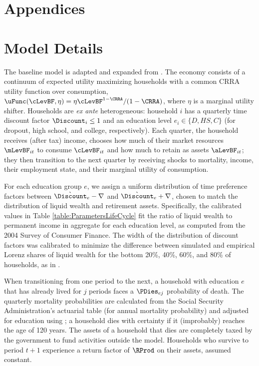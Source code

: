 \documentclass[./ConsumptionResponse]{subfiles}
\begin{document}
\pagestyle{empty}
\appendix
\section*{Appendices}

\section{Model Details} \label{model_details}

The baseline model is adapted and expanded from \cite{cstwMPC}.
The economy consists of a continuum of expected utility maximizing households with a common CRRA utility function over consumption, $\uFunc(\cLevBF,\eta) = \eta \cLevBF^{1-\CRRA}/(1-\CRRA)$, where $\eta$ is a marginal utility shifter.
Households are \textit{ex ante} heterogeneous: household $i$ has a quarterly time discount factor $\Discount_i \leq 1$ and an education level $e_i \in \{D,HS,C\}$ (for dropout, high school, and college, respectively).
Each quarter, the household receives (after tax) income, chooses how much of their market resources $\mLevBF_{it}$ to consume $\cLevBF_{it}$ and how much to retain as assets $\aLevBF_{it}$; they then transition to the next quarter by receiving shocks to mortality, income, their employment state, and their marginal utility of consumption.

For each education group $e$, we assign a uniform distribution of time preference factors between $\grave{\Discount}_e-\nabla$ and $\grave{\Discount}_e+\nabla$, chosen to match the distribution of liquid wealth and retirement assets.
Specifically, the calibrated values in Table \ref{table:ParametersLifeCycle} fit the ratio of liquid wealth to permanent income in aggregate for each education level, as computed from the 2004 Survey of Consumer Finance.
The width of the distribution of discount factors was calibrated to minimize the difference between simulated and empirical Lorenz shares of liquid wealth for the bottom 20\%, 40\%, 60\%, and 80\% of households, as in \cite{cstwMPC}.

When transitioning from one period to the next, a household with education $e$ that has already lived for $j$ periods faces a $\PDies_{ej}$ probability of death.
The quarterly mortality probabilities are calculated from the Social Security Administration's actuarial table (for annual mortality probability) and adjusted for education using \cite{BrownLiebmanPollet}; a household dies with certainty if it (improbably) reaches the age of 120 years.
The assets of a household that dies are completely taxed by the government to fund activities outside the model.
Households who survive to period $t+1$ experience a return factor of $\RProd$ on their assets, assumed constant.
\end{document}
